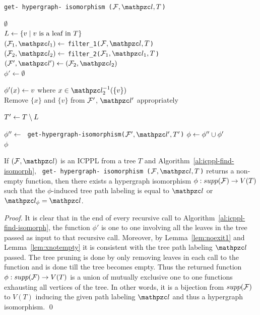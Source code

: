 \documentclass[MS]             %
              {iitmdiss_as}    %
\begin{document}
\begin{algorithm}[h]
  \caption{{\tt get- hypergraph- isomorphism ($\cF, \cl, T$)}}
  \label{al:icppl-find-isomorph}
  \begin{algorithmic}[\lndisplay]

    \RETURN $\emptyset$\\
    \ENDIF
    \STATE $L \leftarrow \{v \mid v \text{ is a leaf in }      T\}$\\
    \STATE $(\cF_1, \cl_1) \assign$ {\tt filter\_1($\cF, \cl,
      T$)}\\
    \STATE $(\cF_2, \cl_2) \assign$ {\tt filter\_2($\cF_1,
      \cl_1, T$)}\\

    \STATE $(\cF', \cl') \assign (\cF_2, \cl_2)$\\
    \STATE $\phi' \leftarrow \emptyset$

    \STATE $\phi'(x) \leftarrow v$ where $x \in \cl_2^{-1}(\{v\})$
    \\
    \STATE Remove $\{x\}$ and $\{v\}$ from ${\cal F}'$, $\cl'$  appropriately\\
    \ENDFOR

    \STATE $T' \leftarrow T \setminus L$

    \STATE $\phi'' \leftarrow$ {\tt
      get-hypergraph-isomorphism($\cF', \cl', T'$)}
    \STATE $\phi \leftarrow \phi'' \cup \phi'$ \\
    \RETURN $\phi$
  \end{algorithmic}
\end{algorithm}

\begin{lemma}
  \label{lem:hyperiso}  %
  If $(\cF, \cl)$ is an ICPPL from a tree $T$ and
  Algorithm~\ref{al:icppl-find-isomorph}, {\tt
    get- hypergraph- isomorphism ($\cF, \cl, T$)} returns a non-empty
  function, then there exists a hypergraph isomorphism $\phi :
  supp({\cal F}) \rightarrow V(T)$ such that the $\phi$-induced tree path
  labeling is equal to $\cl$ or $\cl_\phi = \cl$.
\end{lemma}
\begin{proof}
  It is clear that in the end of every recursive call to
  Algorithm~\ref{al:icppl-find-isomorph}, the function $\phi'$ is one
  to one involving all the leaves in the tree passed as input to that
  recursive call. Moreover, by Lemma~\ref{lem:noexit1} and
  Lemma~\ref{lem:xnotempty} it is consistent with the tree path
  labeling $\cl$ passed. The tree pruning is done by only removing
  leaves in each call to the function and is done till the tree
  becomes empty. Thus the returned function $\phi: supp({\cal F})
  \rightarrow V(T)$ is a union of mutually exclusive one to one
  functions exhausting all vertices of the tree. In other words, it is
  a bijection from $supp({\cal F})$ to $V(T)$ inducing the given path
  labeling $\cl$ and thus a hypergraph isomorphism. \qed
\end{proof}
\end{document}

